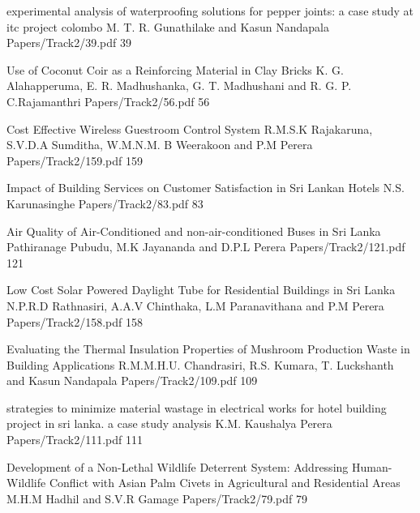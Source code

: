     \addpaper
{experimental analysis of waterproofing solutions
for pepper joints: a case study at itc project
colombo}
  {M. T. R. Gunathilake and Kasun Nandapala} 
 {Papers/Track2/39.pdf}
 {39} 




\addpaper
{Use of Coconut Coir as a Reinforcing Material in Clay Bricks}
{K. G. Alahapperuma, E. R. Madhushanka, G. T. Madhushani and R. G. P. C.Rajamanthri}
{Papers/Track2/56.pdf}
{56}


    \addpaper
{Cost Effective Wireless Guestroom Control System}
 {R.M.S.K Rajakaruna, S.V.D.A Sumditha, W.M.N.M. B Weerakoon and P.M
Perera} 
 {Papers/Track2/159.pdf}
   {159} 


\addpaper
{Impact of Building Services on Customer Satisfaction in Sri Lankan Hotels}
{N.S. Karunasinghe}
{Papers/Track2/83.pdf}
{83}


\addpaper
{Air Quality of Air-Conditioned and non-air-conditioned Buses in Sri Lanka}
{Pathiranage Pubudu, M.K Jayananda and D.P.L Perera}
{Papers/Track2/121.pdf}
{121}


    \addpaper
{Low Cost Solar Powered Daylight Tube for Residential Buildings in Sri Lanka}
 {N.P.R.D Rathnasiri, A.A.V Chinthaka, L.M Paranavithana and P.M Perera} 
 {Papers/Track2/158.pdf}
   {158} 


    \addpaper
{Evaluating the Thermal Insulation Properties of Mushroom Production Waste in Building Applications}
 {R.M.M.H.U. Chandrasiri, R.S. Kumara, T. Luckshanth and Kasun Nandapala} 
 {Papers/Track2/109.pdf}
   {109} 


    \addpaper
{strategies to minimize material wastage in
electrical works for hotel building project in sri
lanka. a case study analysis}
 {K.M. Kaushalya Perera } 
 {Papers/Track2/111.pdf}
   {111} 






\addpaper
{Development of a Non-Lethal Wildlife Deterrent System: Addressing Human-Wildlife Conflict with Asian Palm Civets in Agricultural and Residential Areas}
{M.H.M Hadhil and S.V.R Gamage}
{Papers/Track2/79.pdf}
{79}


